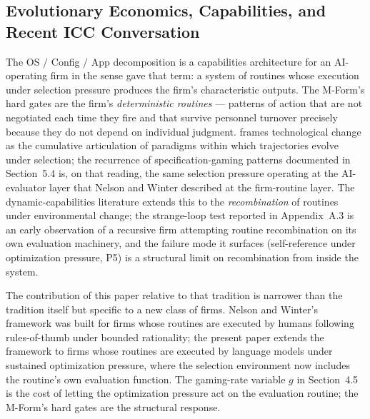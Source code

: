 \documentclass[11pt]{article}
\begin{document}
\subsection{Evolutionary Economics, Capabilities, and Recent ICC Conversation}

The OS / Config / App decomposition is a capabilities architecture for an AI-operating firm in the sense \citet{nelson1982} gave that term: a system of routines whose execution under selection pressure produces the firm's characteristic outputs. The M-Form's hard gates are the firm's \emph{deterministic routines} --- patterns of action that are not negotiated each time they fire and that survive personnel turnover precisely because they do not depend on individual judgment. \citet{dosi1982,dosi1988} frames technological change as the cumulative articulation of paradigms within which trajectories evolve under selection; the recurrence of specification-gaming patterns documented in Section~5.4 is, on that reading, the same selection pressure operating at the AI-evaluator layer that Nelson and Winter described at the firm-routine layer. The dynamic-capabilities literature \citep{teece1997} extends this to the \emph{recombination} of routines under environmental change; the strange-loop test reported in Appendix~A.3 is an early observation of a recursive firm attempting routine recombination on its own evaluation machinery, and the failure mode it surfaces (self-reference under optimization pressure, P5) is a structural limit on recombination from inside the system.

The contribution of this paper relative to that tradition is narrower than the tradition itself but specific to a new class of firms. Nelson and Winter's framework was built for firms whose routines are executed by humans following rules-of-thumb under bounded rationality; the present paper extends the framework to firms whose routines are executed by language models under sustained optimization pressure, where the selection environment now includes the routine's own evaluation function. The gaming-rate variable $g$ in Section~4.5 is the cost of letting the optimization pressure act on the evaluation routine; the M-Form's hard gates are the structural response.
\end{document}
